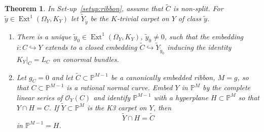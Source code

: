 \documentclass[11pt,twoside]{amsart}
\theoremstyle{plain}
\newtheorem{theorem}{Theorem}[section]
\theoremstyle{definition}
\newcommand{\PP}{\mathbb{P}}
\newcommand{\PM}{\mathbb{P}^M}
\newcommand{\OO}{\mathcal{O}}
\newcommand{\Ext}{\operatorname{Ext}}
\newcommand{\Yt}{\widetilde{Y}}
\newcommand{\Ct}{\widetilde{C}}
\newcommand{\yt}{\tilde{y}}
\begin{document}
\begin{theorem}\label{thm:extension}
In Set-up~\ref{setup:ribbon}, assume that $\Ct$ is non-split. For $\yt\in\Ext^1(\Omega_Y,K_Y)$ let $\Yt_{\yt}$ be the $K$-trivial carpet on $Y$ of class $\yt$.
\begin{enumerate}
\item There is a unique $\yt_0\in\Ext^1(\Omega_Y,K_Y)$, $\widetilde y_0 \neq 0$, such that the embedding $i\colon C\hookrightarrow Y$ extends to a closed embedding $\Ct\hookrightarrow\Yt_{\yt_0}$ inducing the identity $K_Y|_C=L_C$ on conormal bundles.
\item Let $g_C=0$ and let $\Ct\subset\PP^{M-1}$ be a canonically embedded ribbon, $M=g$, so that $C\subset\PP^{M-1}$ is a rational normal curve. Embed $Y$ in $\PM$ by the complete linear series of $\OO_Y(C)$ and identify $\PP^{M-1}$ with a hyperplane $H\subset\PM$ so that $Y\cap H=C$. If $\Yt\subset\PM$ is the K3 carpet on $Y$, then
\[
\Yt\cap H=\Ct
\]
in $\PP^{M-1}=H$.
\end{enumerate}
\end{theorem}
\end{document}
